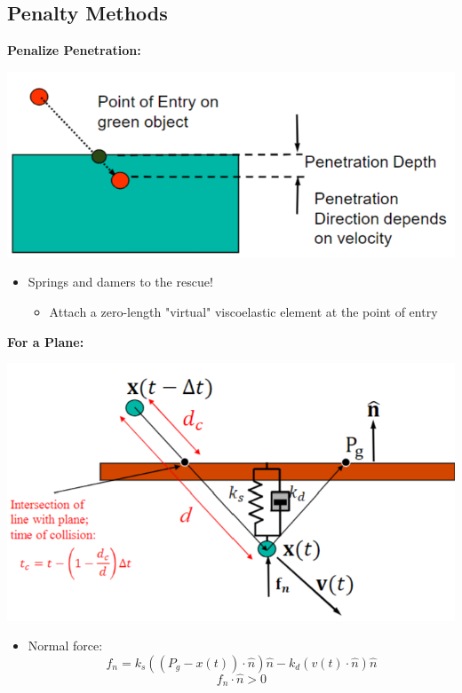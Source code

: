 \documentclass{article}
\begin{document}
\subsection*{Penalty Methods}
\textbf{Penalize Penetration:}
\begin{center}
    \includegraphics*[scale=0.85]{W6_1.png}
\end{center}
\begin{itemize}
    \item Springs and damers to the rescue!
    \begin{itemize}
        \item Attach a zero-length "virtual" viscoelastic element at the point of entry
    \end{itemize}
\end{itemize}
\textbf{For a Plane:}
\begin{center}
    \includegraphics*[scale=0.8]{W6_2.png}
\end{center}
\begin{itemize}
    \item Normal force:
    \[f_n = k_s \left((P_g - x(t)) \cdot \hat n\right) \hat n - k_d(v(t) \cdot \hat n) \hat n\]
    \[f_n \cdot \hat n > 0\]
\end{itemize}
\end{document}
